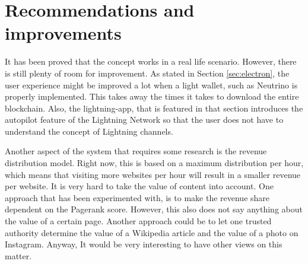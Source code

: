  

\section{Recommendations and improvements}
It has been proved that the concept works in a real life scenario. However, there is still plenty of room for improvement. As stated in Section \ref{sec:electron}, the user experience might be improved a lot when a light wallet, such as Neutrino is properly implemented. This takes away the times it takes to download the entire blockchain. Also, the lightning-app, that is featured in that section introduces the autopilot feature of the Lightning Network so that the user does not have to understand the concept of Lightning channels. 

Another aspect of the system that requires some research is the revenue distribution model. Right now, this is based on a maximum distribution per hour, which means that visiting more websites per hour will result in a smaller revenue per website. It is very hard to take the value of content into account. One approach that has been experimented with, is to make the revenue share dependent on the Pagerank score. However, this also does not say anything about the value of a certain page. Another approach could be to let one trusted authority determine the value of a Wikipedia article and the value of a photo on Instagram. Anyway, It would be very interesting to have other views on this matter. 